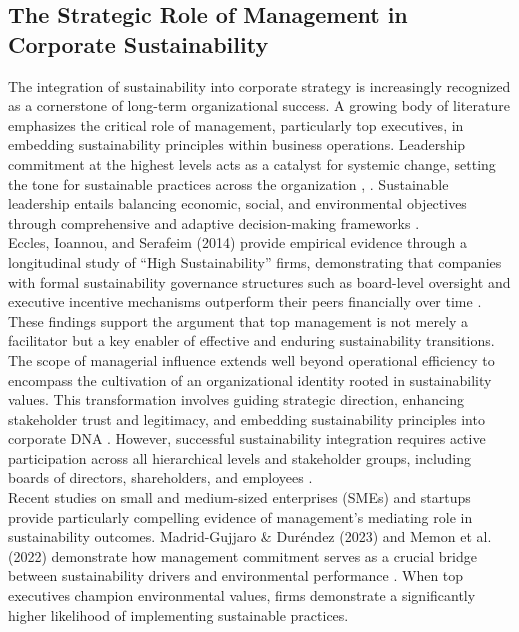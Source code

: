 	\subsection{The Strategic Role of Management in Corporate Sustainability}
	The integration of sustainability into corporate strategy is increasingly recognized as a cornerstone of long-term organizational success. A growing body of literature emphasizes the critical role of management, particularly top executives, in embedding sustainability principles within business operations. Leadership commitment at the highest levels acts as a catalyst for systemic change, setting the tone for sustainable practices across the organization \textcite{Avery2005}, \textcite{Waldman2008}. Sustainable leadership entails balancing economic, social, and environmental objectives through comprehensive and adaptive decision-making frameworks \cite{Lozano2015}. \\
	
	Eccles, Ioannou, and Serafeim (2014) provide empirical evidence through a longitudinal study of “High Sustainability” firms, demonstrating that companies with formal sustainability governance structures such as board-level oversight and executive incentive mechanisms outperform their peers financially over time \cite{Eccles2014}. These findings support the argument that top management is not merely a facilitator but a key enabler of effective and enduring sustainability transitions. \\
	
	The scope of managerial influence extends well beyond operational efficiency to encompass the cultivation of an organizational identity rooted in sustainability values. This transformation involves guiding strategic direction, enhancing stakeholder trust and legitimacy, and embedding sustainability principles into corporate DNA \cite{Eccles2014, Dyllick2016}. However, successful sustainability integration requires active participation across all hierarchical levels and stakeholder groups, including boards of directors, shareholders, and employees \cite{Freeman1984}. \\
	
	Recent studies on small and medium-sized enterprises (SMEs) and startups provide particularly compelling evidence of management’s mediating role in sustainability outcomes. Madrid-Gujjaro \& Duréndez (2023) and Memon et al. (2022) demonstrate how management commitment serves as a crucial bridge between sustainability drivers and environmental performance \cite{Madrid2023, Memon2022}. When top executives champion environmental values, firms demonstrate a significantly higher likelihood of implementing sustainable practices. \\
	

